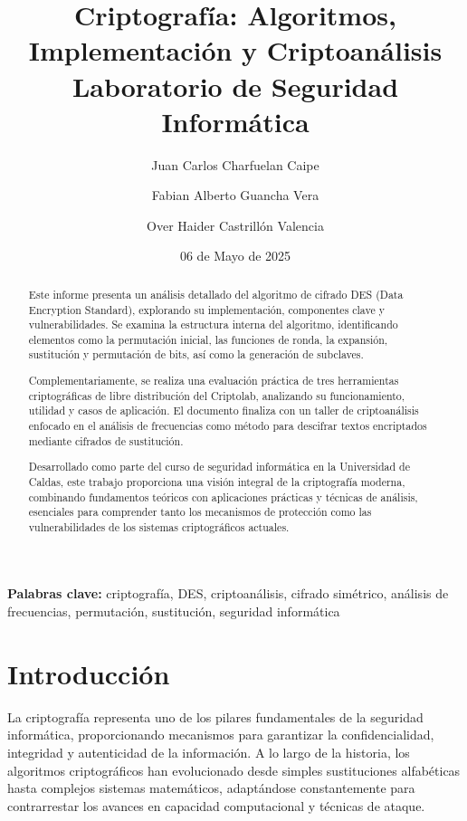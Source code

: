 \documentclass[12pt,a4paper]{article}
\begin{document}
\title{\LARGE \textbf{
		Criptografía: Algoritmos, Implementación y Criptoanálisis
	}\\\vspace{0.5cm}\Large
	Laboratorio de Seguridad Informática
}

\author[1]{Juan Carlos Charfuelan Caipe}
\author[2]{Fabian Alberto Guancha Vera}
\author[3]{Over Haider Castrillón Valencia}




\date{06 de Mayo de 2025}

\maketitle

\begin{abstract}
	Este informe presenta un análisis detallado del algoritmo de cifrado DES (Data Encryption Standard), explorando su implementación, componentes clave y vulnerabilidades. Se examina la estructura interna del algoritmo, identificando elementos como la permutación inicial, las funciones de ronda, la expansión, sustitución y permutación de bits, así como la generación de subclaves.

	Complementariamente, se realiza una evaluación práctica de tres herramientas criptográficas de libre distribución del Criptolab, analizando su funcionamiento, utilidad y casos de aplicación. El documento finaliza con un taller de criptoanálisis enfocado en el análisis de frecuencias como método para descifrar textos encriptados mediante cifrados de sustitución.

	Desarrollado como parte del curso de seguridad informática en la Universidad de Caldas, este trabajo proporciona una visión integral de la criptografía moderna, combinando fundamentos teóricos con aplicaciones prácticas y técnicas de análisis, esenciales para comprender tanto los mecanismos de protección como las vulnerabilidades de los sistemas criptográficos actuales.
\end{abstract}

\textbf{Palabras clave:} criptografía, DES, criptoanálisis, cifrado simétrico, análisis de frecuencias, permutación, sustitución, seguridad informática

\section{Introducción}
La criptografía representa uno de los pilares fundamentales de la seguridad informática, proporcionando mecanismos para garantizar la confidencialidad, integridad y autenticidad de la información. A lo largo de la historia, los algoritmos criptográficos han evolucionado desde simples sustituciones alfabéticas hasta complejos sistemas matemáticos, adaptándose constantemente para contrarrestar los avances en capacidad computacional y técnicas de ataque.
\end{document}
